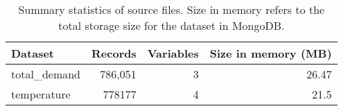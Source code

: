 \begin{table}[H]
\centering
\begin{tabular}{lrrr}
\toprule
Dataset & Records & Variables & Size in memory (MB) \\
\midrule
total\_demand & 786,051 & 3 & 26.47 \\
temperature & 778177 & 4 & 21.5 \\
\bottomrule
\end{tabular}
\caption{Summary statistics of source files. Size in memory refers to the total storage size for the dataset in MongoDB.}
\label{metadata}
\end{table}
